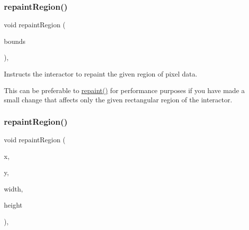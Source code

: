 \mbox{\label{classGDrawingSurface_a769c46fb3e1004aec76e8b0adfa42aa6}} 
\subsubsection{\texorpdfstring{repaint\+Region()}{repaintRegion()}\hspace{0.1cm}{\footnotesize\ttfamily [1/2]}}
{\footnotesize\ttfamily void repaint\+Region (\begin{DoxyParamCaption}\item[{const \mbox{\hyperlink{classGRectangle}{G\+Rectangle}} \&}]{bounds }\end{DoxyParamCaption})\hspace{0.3cm}{\ttfamily [virtual]}, {\ttfamily [inherited]}}



Instructs the interactor to repaint the given region of pixel data. 

This can be preferable to \mbox{\hyperlink{classGDrawingSurface_a4a8ae47b42f1e6a41b65d3546df46218}{repaint()}} for performance purposes if you have made a small change that affects only the given rectangular region of the interactor. \mbox{\label{classGForwardDrawingSurface_a52152a764c4c4b092f826eee5d6554aa}} 
\subsubsection{\texorpdfstring{repaint\+Region()}{repaintRegion()}\hspace{0.1cm}{\footnotesize\ttfamily [2/2]}}
{\footnotesize\ttfamily void repaint\+Region (\begin{DoxyParamCaption}\item[{int}]{x,  }\item[{int}]{y,  }\item[{int}]{width,  }\item[{int}]{height }\end{DoxyParamCaption})\hspace{0.3cm}{\ttfamily [virtual]}, {\ttfamily [inherited]}}

\mbox{\label{classGWindow_a519fb2ac767f8b2febbb50b898b8c8cb}} 
